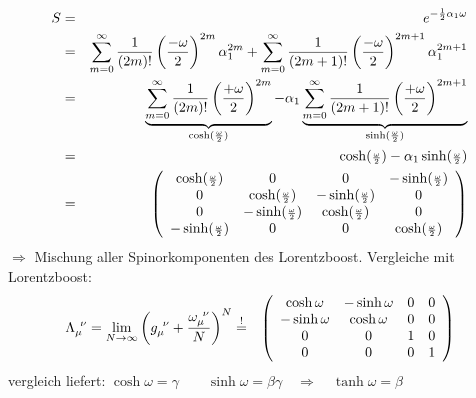 \begin{enumerate}
\begin{eqnarray*}
\end{eqnarray*}
\begin{eqnarray*}
S &=& e^{- \frac 1 2\alpha_1 \omega }\\
&=& \sum \limits_{m = 0}^{\infty} \frac{1}{(2m)!} \left ( \frac{- \omega}2\right)^{2m} \alpha_1^{2m}+
\sum \limits_{m = 0}^{\infty} \frac{1}{(2m+1)!} \left ( \frac{- \omega}2\right)^{2m+1} \alpha_1^{2m+1}\\
&=& \underbrace{\sum \limits_{m = 0}^{\infty} \frac{1}{(2m)!} \left ( \frac{+ \omega}2\right)^{2m}}_ {\cosh({\scriptstyle \frac{\omega}2})} -\alpha_1
\underbrace{\sum \limits_{m = 0}^{\infty} \frac{1}{(2m+1)!} \left ( \frac{+ \omega}2\right)^{2m+1}}_{\sinh({\scriptstyle\frac{\omega}2})}\\
&=& \cosh({\scriptstyle \frac{\omega} 2}) - \alpha_1 \sinh({\scriptstyle\frac{\omega}2})\\
&=& \left ( \begin{array}{cccc} \cosh({\scriptstyle\frac{\omega}2})&0&0&-\sinh({\scriptstyle\frac{\omega}2})\\
0&\cosh({\scriptstyle\frac{\omega}2})&-\sinh({\scriptstyle\frac{\omega}2})&0\\
0&-\sinh({\scriptstyle\frac{\omega}2})&\cosh({\scriptstyle\frac{\omega}2})&0\\-\sinh({\scriptstyle\frac{\omega}2})&0&0&\cosh({\scriptstyle\frac{\omega}2})\end{array}\right)
\end{eqnarray*}
$\Longrightarrow$ Mischung aller Spinorkomponenten des Lorentzboost.
Vergleiche mit Lorentzboost: 
\begin{eqnarray*}
	\Lambda_{\mu}^{\;\,\nu}=\lim_{N\to\infty}\left( g_{\mu}^{\;\,\nu} + \frac{\omega_{\mu}^{\;\,\nu}}{N} \right)^N &\overset{!}=& \left(\begin{array}{cccc} \cosh\omega & -\sinh\omega & 0 & 0 \\ -\sinh\omega & \cosh\omega & 0 & 0 \\  0 & 0 & 1 & 0\\ 0 & 0 & 0 & 1 \end{array}\right)
\end{eqnarray*}	
vergleich liefert: $\cosh\omega=\gamma\qquad \sinh\omega=\beta\gamma \quad\Rightarrow\quad \tanh\omega=\beta$
\end{enumerate}


